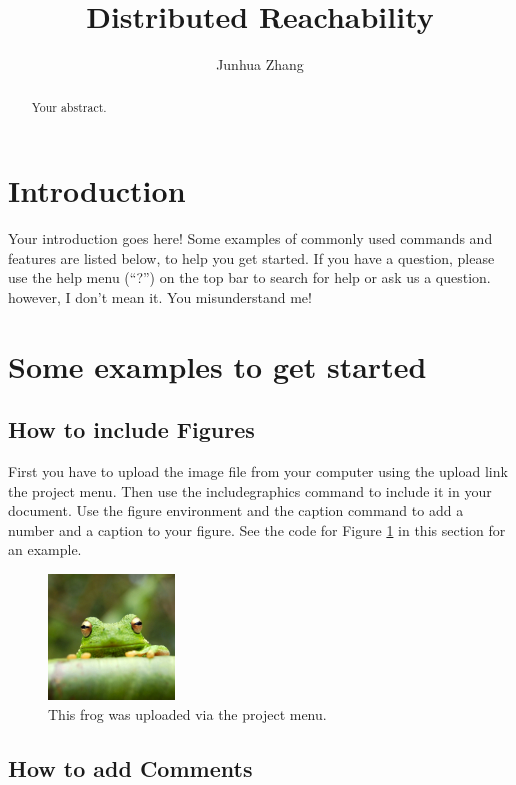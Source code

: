 \documentclass[a4paper]{article}
\title{Distributed Reachability}
\author{Junhua Zhang}
\begin{document}
\maketitle

\begin{abstract}
Your abstract.
\end{abstract}

\section{Introduction}

Your introduction goes here! Some examples of commonly used commands and features are listed below, to help you get started. If you have a question, please use the help menu (``?'') on the top bar to search for help or ask us a question. 
however, I don't mean it. You misunderstand me!


\section{Some examples to get started}

\subsection{How to include Figures}

First you have to upload the image file from your computer using the upload link the project menu. Then use the includegraphics command to include it in your document. Use the figure environment and the caption command to add a number and a caption to your figure. See the code for Figure \ref{fig:frog} in this section for an example.

\begin{figure}
\centering
\includegraphics[width=0.3\textwidth]{frog.jpg}
\caption{\label{fig:frog}This frog was uploaded via the project menu.}
\end{figure}

\subsection{How to add Comments}
\end{document}

